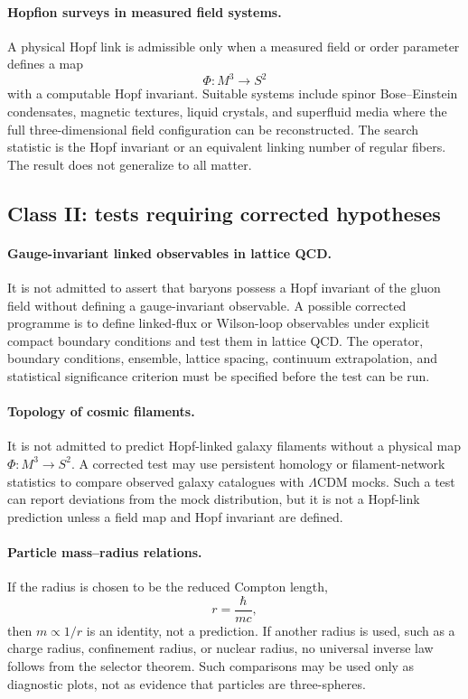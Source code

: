 \documentclass[11pt,a4paper]{article}
\begin{document}
\paragraph{Hopfion surveys in measured field systems.}
A physical Hopf link is admissible only when a measured field or order parameter defines a map
\[
\Phi:M^3\to S^2
\]
with a computable Hopf invariant.  Suitable systems include spinor Bose--Einstein condensates, magnetic textures, liquid crystals, and superfluid media where the full three-dimensional field configuration can be reconstructed.  The search statistic is the Hopf invariant or an equivalent linking number of regular fibers.  The result does not generalize to all matter.

\subsection{Class II: tests requiring corrected hypotheses}

\paragraph{Gauge-invariant linked observables in lattice QCD.}
It is not admitted to assert that baryons possess a Hopf invariant of the gluon field without defining a gauge-invariant observable.  A possible corrected programme is to define linked-flux or Wilson-loop observables under explicit compact boundary conditions and test them in lattice QCD.  The operator, boundary conditions, ensemble, lattice spacing, continuum extrapolation, and statistical significance criterion must be specified before the test can be run.

\paragraph{Topology of cosmic filaments.}
It is not admitted to predict Hopf-linked galaxy filaments without a physical map $\Phi:M^3\to S^2$.  A corrected test may use persistent homology or filament-network statistics to compare observed galaxy catalogues with $\Lambda$CDM mocks.  Such a test can report deviations from the mock distribution, but it is not a Hopf-link prediction unless a field map and Hopf invariant are defined.

\paragraph{Particle mass--radius relations.}
If the radius is chosen to be the reduced Compton length,
\[
r=\frac{\hbar}{mc},
\]
then $m\propto1/r$ is an identity, not a prediction.  If another radius is used, such as a charge radius, confinement radius, or nuclear radius, no universal inverse law follows from the selector theorem.  Such comparisons may be used only as diagnostic plots, not as evidence that particles are three-spheres.
\end{document}
